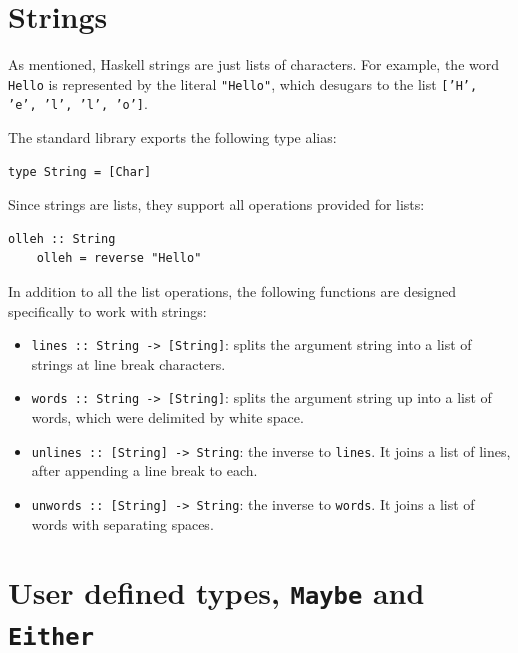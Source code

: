 \documentclass[UdineBachThesis,american,11pt]{PhdThesis}
\begin{document}
  \section{Strings}
  \label{section:strings}

  As mentioned, Haskell strings are just lists of characters. For example, the
  word \mbox{\texttt{Hello}} is represented by the literal
  \mbox{\texttt{"Hello"}}, which desugars to the list
  \mbox{\texttt{['H', 'e', 'l', 'l', 'o']}}.

  \pagebreak

  The standard library exports the following type alias:

  \begin{Verbatim}[gobble=4,fontsize=\small]
    type String = [Char]
  \end{Verbatim}

  Since strings are lists, they support all operations provided for lists:

  \begin{Verbatim}[gobble=4,fontsize=\small]
    olleh :: String
    olleh = reverse "Hello"
  \end{Verbatim}

  In addition to all the list operations, the following functions are designed
  specifically to work with strings:

  \begin{itemize}
    \item \mbox{\texttt{lines :: String -> [String]}}: splits the argument
    string into a list of strings at line break characters.

    \item \mbox{\texttt{words :: String -> [String]}}: splits the argument
    string up into a list of words, which were delimited by white space.

    \item \mbox{\texttt{unlines :: [String] -> String}}: the inverse to
    \mbox{\texttt{lines}}. It joins a list of lines, after appending a line
    break to each.

    \item \mbox{\texttt{unwords :: [String] -> String}}: the inverse to
    \mbox{\texttt{words}}. It joins a list of words with separating spaces.
  \end{itemize}

  \section{User defined types, \texttt{Maybe} and \texttt{Either}}
  \label{section:user-defined-types}
\end{document}
